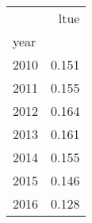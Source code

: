 \begin{tabular}{lr}
\toprule
{} &  ltue \\
year &       \\
\midrule
2010 & 0.151 \\
2011 & 0.155 \\
2012 & 0.164 \\
2013 & 0.161 \\
2014 & 0.155 \\
2015 & 0.146 \\
2016 & 0.128 \\
\bottomrule
\end{tabular}
